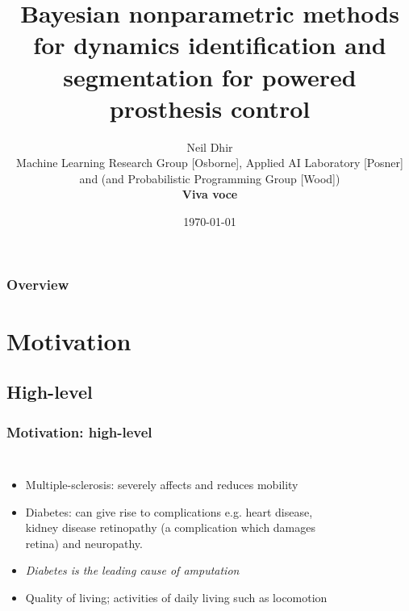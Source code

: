 \documentclass[aspectratio=169]{beamer}
\title[Nonparametrics]{Bayesian nonparametric methods for dynamics identification and segmentation for powered
prosthesis control}
\author
{\texorpdfstring{
Neil Dhir  \\
\footnotesize Machine Learning Research Group [Osborne], Applied AI Laboratory [Posner] and (and Probabilistic Programming Group
[Wood])
\vspace{1.5cm}\\
{\bfseries{Viva voce}}
}%
{} 
\date{\today}} %
\begin{document}
\begin{frame}
\titlepage %
\end{frame}

\begin{frame}
\frametitle{Overview} %
\tableofcontents %
\end{frame}


\section{Motivation}

\begin{frame}[plain]
\subsection{High-level}
\frametitle{Motivation: high-level}
\begin{columns}[t] %

    \begin{itemize}
        \item Multiple-sclerosis: severely affects and reduces mobility 
        \item Diabetes: can give rise to complications e.g. heart disease, kidney disease
            retinopathy (a complication which damages retina) and neuropathy. 
        \item {\it Diabetes is the leading cause of amputation} 
        \item Quality of living; activities of daily living such as locomotion
    \end{itemize}
\begin{figure}[ht]
    \\[-0em]
\end{figure}
\end{columns}
\end{frame}
\end{document}
